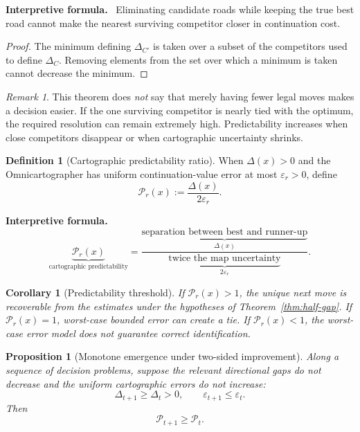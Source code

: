 \documentclass[11pt]{article}
\newtheorem{proposition}[theorem]{Proposition}
\newtheorem{corollary}[theorem]{Corollary}
\theoremstyle{definition}
\newtheorem{definition}[theorem]{Definition}
\theoremstyle{remark}
\newtheorem{remark}[theorem]{Remark}
\newcommand{\Gap}{\Delta}
\newcommand{\eps}{\varepsilon}
\newenvironment{interpretiveformula}{%
  \begin{center}\begin{minipage}{0.92\textwidth}\small
  \textbf{Interpretive formula.}\ }{\end{minipage}\end{center}}
\begin{document}
\begin{interpretiveformula}
Eliminating candidate roads while keeping the true best road cannot make the nearest surviving competitor closer in continuation cost.
\end{interpretiveformula}

\begin{proof}
The minimum defining $\Gap_{C'}$ is taken over a subset of the competitors used to define $\Gap_C$. Removing elements from the set over which a minimum is taken cannot decrease the minimum.
\end{proof}

\begin{remark}
This theorem does \emph{not} say that merely having fewer legal moves makes a decision easier. If the one surviving competitor is nearly tied with the optimum, the required resolution can remain extremely high. Predictability increases when close competitors disappear or when cartographic uncertainty shrinks.
\end{remark}

\begin{definition}[Cartographic predictability ratio]
When $\Gap(x)>0$ and the Omnicartographer has uniform continuation-value error at most $\eps_r>0$, define
\[
\mathcal P_r(x):=\frac{\Gap(x)}{2\eps_r}.
\]
\end{definition}

\begin{interpretiveformula}
\[
\underbrace{\mathcal P_r(x)}_{\text{cartographic predictability}}
=
\frac{\underbrace{\text{separation between best and runner-up}}_{\Gap(x)}}{\underbrace{\text{twice the map uncertainty}}_{2\eps_r}}.
\]
\end{interpretiveformula}

\begin{corollary}[Predictability threshold]
If $\mathcal P_r(x)>1$, the unique next move is recoverable from the estimates under the hypotheses of Theorem~\ref{thm:half-gap}. If $\mathcal P_r(x)=1$, worst-case bounded error can create a tie. If $\mathcal P_r(x)<1$, the worst-case error model does not guarantee correct identification.
\end{corollary}

\begin{proposition}[Monotone emergence under two-sided improvement]
Along a sequence of decision problems, suppose the relevant directional gaps do not decrease and the uniform cartographic errors do not increase:
\[
\Gap_{t+1}\ge\Gap_t>0,\qquad \eps_{t+1}\le\eps_t.
\]
Then
\[
\mathcal P_{t+1}\ge\mathcal P_t.
\]
\end{proposition}
\end{document}

